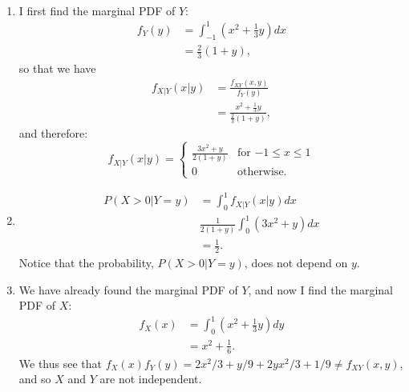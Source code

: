 \begin{problem}{20}
\begin{enumerate}
\end{enumerate}

\end{problem}

\begin{problem}{21} $ $
\begin{enumerate}
\item I first find the marginal PDF of $Y$:
\begin{align*}
f_Y(y) &= \int_{-1}^{1} \left(x^2+\frac{1}{3}y\right)dx \\
& =\frac{2}{3}(1+y),
\end{align*}
so that we have
\begin{align*}
f_{X|Y}(x|y) &= \frac{f_{XY}(x,y)}{f_Y(y)} \\
& =\frac{x^2+\frac{1}{3}y}{\frac{2}{3} (1+y)},
\end{align*}
and therefore:
\[
 f_{X|Y}(x|y) =
  \begin{cases}
                                   \frac{3x^2+y}{ 2(1+y)} & \text{for $-1 \le x \le 1$} \\
                                   0& \text{otherwise}.
   \end{cases}
\]



\item 
\begin{align*}
P(X>0|Y=y) &= \int_0^1 f_{X|Y}(x|y)dx \\
&\frac{1}{2(1+y)} \int_0^1 \left(3x^2+y \right) dx \\
& =\frac{1}{2}.
\end{align*}
Notice that the probability, $P(X>0|Y=y)$, does not depend on $y$.

\item We have already found the marginal PDF of $Y$, and now I find the marginal PDF of $X$:
\begin{align*}
f_X(x) &= \int_{0}^{1} \left(x^2+\frac{1}{3}y\right)dy \\
& =x^2 +\frac{1}{6}.
\end{align*}
We thus see that $f_X(x)f_Y(y) = 2x^2/3+y/9+2 y x^2/3+1/9 \ne f_{XY}(x, y)$, and so $X$ and $Y$ are not independent.

\end{enumerate}
\end{problem}


